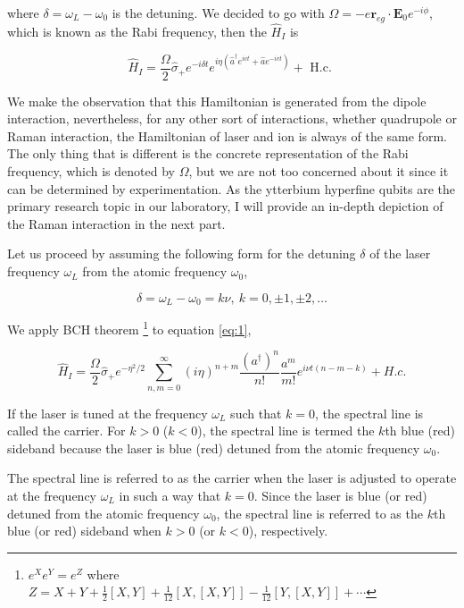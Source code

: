where $\delta = \omega_L-\omega_0$ is the detuning. We decided to go with $\Omega=-e \mathbf{r}_{e g} \cdot \mathbf{E}_0 e^{-i \phi}$, which is known as the Rabi frequency, then the $\hat{H}_I$ is

\begin{equation}\label{eq:1}
    \hat{H}_I=\frac{\Omega}{2} \hat{\sigma}_{+} e^{-i \delta t} e^{i \eta\left(\hat{a}^{\dagger} e^{i v t}+\hat{a} e^{-i v t}\right)}+\text { H.c. }
\end{equation}

We make the observation that this Hamiltonian is generated from the dipole interaction, nevertheless, for any other sort of interactions, whether quadrupole or Raman interaction, the Hamiltonian of laser and ion is always of the same form. The only thing that is different is the concrete representation of the Rabi frequency, which is denoted by $\Omega$, but we are not too concerned about it since it can be determined by experimentation. As the ytterbium hyperfine qubits are the primary research topic in our laboratory, I will provide an in-depth depiction of the Raman interaction in the next part.

Let us proceed by assuming the following form for the detuning $\delta$ of the laser frequency $\omega_L$ from the atomic frequency $\omega_0$,

\begin{equation}
    \delta=\omega_L-\omega_0=k\nu, \ k=0,\pm1,\pm2,\dots
\end{equation}

We apply BCH theorem \footnote{$e^{X} e^{Y}=e^{Z}$ where $Z=X+Y+\frac{1}{2}[X, Y]+\frac{1}{12}[X,[X, Y]]-\frac{1}{12}[Y,[X, Y]]+\cdots$} to equation \eqref{eq:1},

\begin{equation}
    \label{2}
    \hat{H}_I=\frac{\Omega}{2} \hat{\sigma}_+ e^{-\eta^2/2}\sum_{n,m=0}^{\infty} (i\eta)^{n+m}\frac{(a^\dagger)^n}{n!}\frac{a^m}{m!}e^{i\nu t (n-m-k)} + H.c.
\end{equation}

If the laser is tuned at the frequency $\omega_L$ such that $k=0$, the spectral line is called the carrier. For $k>0$ ($k<0$), the spectral line is termed the $k$th blue (red) sideband because the laser is blue (red) detuned from the atomic frequency $\omega_0$.

The spectral line is referred to as the carrier when the laser is adjusted to operate at the frequency $\omega_L$ in such a way that $k=0$. Since the laser is blue (or red) detuned from the atomic frequency $\omega_0$, the spectral line is referred to as the $k$th blue (or red) sideband when $k>0$ (or $k<0$), respectively.


